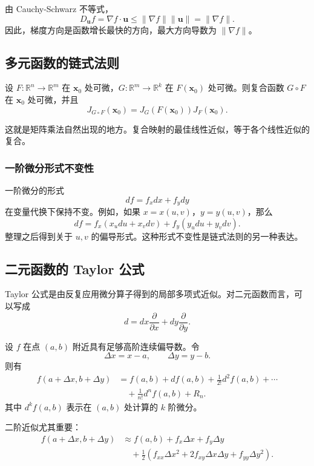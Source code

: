 由 Cauchy-Schwarz 不等式，
\[
    D_{\mathbf{u}}f=\nabla f\cdot\mathbf{u}
    \leq \|\nabla f\|\|\mathbf{u}\|=\|\nabla f\|.
\]
因此，梯度方向是函数增长最快的方向，最大方向导数为 $\|\nabla f\|$。

\subsection{多元函数的链式法则}

\begin{theorem}[链式法则]
设 $F:\mathbb{R}^n\to\mathbb{R}^m$ 在 $\mathbf{x}_0$ 处可微，$G:\mathbb{R}^m\to\mathbb{R}^k$ 在 $F(\mathbf{x}_0)$ 处可微。则复合函数 $G\circ F$ 在 $\mathbf{x}_0$ 处可微，并且
\[
    J_{G\circ F}(\mathbf{x}_0)=J_G(F(\mathbf{x}_0))J_F(\mathbf{x}_0).
\]
\end{theorem}

这就是矩阵乘法自然出现的地方。复合映射的最佳线性近似，等于各个线性近似的复合。

\subsubsection{一阶微分形式不变性}

一阶微分的形式
\[
    df=f_xdx+f_ydy
\]
在变量代换下保持不变。例如，如果 $x=x(u,v)$，$y=y(u,v)$，那么
\[
    df=f_x(x_ud u+x_vd v)+f_y(y_ud u+y_vd v).
\]
整理之后得到关于 $u,v$ 的偏导形式。这种形式不变性是链式法则的另一种表达。

\subsection{二元函数的 Taylor 公式}

Taylor 公式是由反复应用微分算子得到的局部多项式近似。对二元函数而言，可以写成
\[
    d=dx\frac{\partial}{\partial x}+dy\frac{\partial}{\partial y}.
\]

\begin{theorem}[Taylor 公式]
设 $f$ 在点 $(a,b)$ 附近具有足够高阶连续偏导数。令
\[
    \Delta x=x-a,
    \qquad
    \Delta y=y-b.
\]
则有
\[
\begin{aligned}
    f(a+\Delta x,b+\Delta y)
    &=f(a,b)+df(a,b)+\frac{1}{2!}d^2f(a,b)+\cdots \\
    &\quad +\frac{1}{n!}d^nf(a,b)+R_n.
\end{aligned}
\]
其中 $d^kf(a,b)$ 表示在 $(a,b)$ 处计算的 $k$ 阶微分。
\end{theorem}

二阶近似尤其重要：
\[
\begin{aligned}
    f(a+\Delta x,b+\Delta y)
    &\approx f(a,b)+f_x\Delta x+f_y\Delta y \\
    &\quad +\frac12\left(f_{xx}\Delta x^2+2f_{xy}\Delta x\Delta y+f_{yy}\Delta y^2\right).
\end{aligned}
\]

